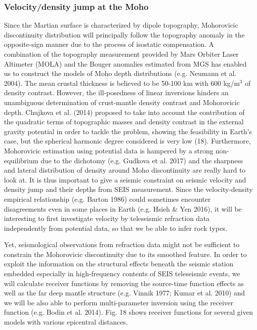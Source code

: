 \subsubsection{Velocity/density jump at the Moho}
Since the Martian surface is characterized by dipole topography, Mohorovicic discontinuity distribution will principally follow the topography anomaly in the opposite-sign manner due to the process of isostatic compensation. A combination of the topography measurement provided by Mars Orbiter Laser Altimeter (MOLA) and the Bouger anomalies estimated from MGS has enabled us to construct the models of Moho depth distributions (e.g. Neumann et al. 2004). The mean crustal thickness is believed to be 50-100 km with 600 kg/m$^3$ of density contrast. However, the ill-posedness of linear inversions hinders an unambiguous determination of crust-mantle density contrast and Mohorovicic depth. Chujkova et al. (2014) proposed to take into account the contribution of the quadratic terms of topographic masses and density contrast in the external gravity potential in order to tackle the problem, showing the feasibility in Earth’s case, but the spherical harmonic degree considered is very low (18). Furthermore, Mohorovicic estimation using potential data is hampered by a strong non-equilibrium due to the dichotomy (e.g. Gudkova et al. 2017) and the sharpness and lateral distribution of density around Moho discontinuity are really hard to look at. It is thus important to give a seismic constraint on seismic velocity and density jump and their depths from SEIS measurement. Since the velocity-density empirical relationship (e.g. Barton 1986) could sometimes encounter disagreements even in some places in Earth (e.g. Hsieh \& Yen 2016), it will be interesting to first investigate velocity by teleseismic refraction data independently from potential data, so that we be able to infer rock types.

Yet, seismological observations from refraction data might not be sufficient to constrain the Mohorovicic discontinuity due to its smoothed feature. In order to exploit the information on the structural effects beneath the seismic station embedded especially in high-frequency contents of SEIS teleseismic events, we will calculate receiver functions by removing the source-time function effects as well as the far deep mantle structure (e.g. Vinnik 1977; Kumar et al. 2010) and we will be also able to perform multi-parameter inversion using the receiver function (e.g. Bodin et al. 2014). Fig. 18 shows receiver functions for several given models with various epicentral distances.

